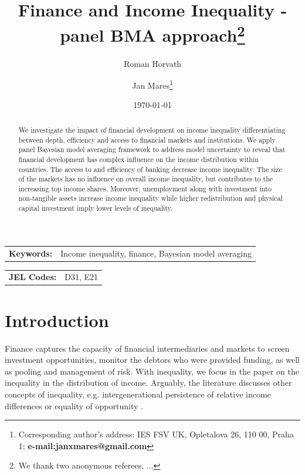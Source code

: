 \documentclass[a4paper,11pt]{article}
\title{Finance and Income Inequality - panel BMA approach\thanks{We thank two anonymous referees, ...}}
\author[a]{Roman Horvath}
\author[a]{Jan Mares\footnote{\footnotesize Corresponding author's address: IES FSV UK, Opletalova 26, 110 00, Praha 1; \textbf{e-mail:janxmares@gmail.com}}}
\affil[a]{Charles University, Prague}
\date{\today}
\begin{document}
\def\sym#1{\ifmmode^{#1}\else\(^{#1}\)\fi} %

\maketitle

\thispagestyle{empty}
\begin{abstract}
    We investigate the impact of financial development on income inequality differentiating between depth, efficiency and access to financial markets and institutions. We apply panel Bayesian model averaging framework to address model uncertainty to reveal that financial development has complex influence on the income distribution within countries. The access to and efficiency of banking decrease income inequality. The size of the markets has no influence on overall income inequality, but contributes to the increasing top income shares. Moreover, unemployment along with investment into non-tangible assets increase income inequality while higher redistribution and physical capital investment imply lower levels of inequality.
\end{abstract}

\bigskip

\begin{tabular}{p{0.25\hsize}p{0.6\hsize}} %
\textbf{Keywords:} & Income inequality, finance, Bayesian model averaging
\end{tabular}

\bigskip

\begin{tabular}{p{0.25\hsize}p{0.6\hsize}}
\textbf{JEL Codes:} & D31, E21\\
\end{tabular}

\clearpage
\setcounter{page}{1}

\section{Introduction}
Finance captures the capacity of financial intermediaries and markets to screen investment opportunities, monitor the debtors who were provided funding, as well as pooling and management of risk. With inequality, we focus in the paper on the inequality in the distribution of income. Arguably, the literature discusses other concepts of inequality, e.g. intergenerational persistence of relative income differences or equality of opportunity \citep{demirgucc2009finance}.
\end{document}
